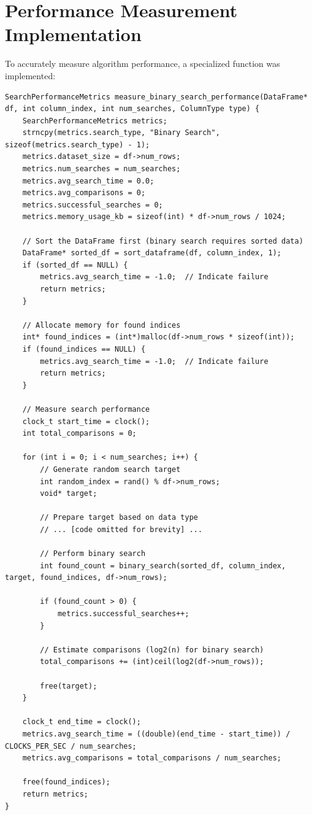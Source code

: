 \section{Performance Measurement Implementation}

To accurately measure algorithm performance, a specialized function was implemented:

\begin{lstlisting}[style=c]
SearchPerformanceMetrics measure_binary_search_performance(DataFrame* df, int column_index, int num_searches, ColumnType type) {
    SearchPerformanceMetrics metrics;
    strncpy(metrics.search_type, "Binary Search", sizeof(metrics.search_type) - 1);
    metrics.dataset_size = df->num_rows;
    metrics.num_searches = num_searches;
    metrics.avg_search_time = 0.0;
    metrics.avg_comparisons = 0;
    metrics.successful_searches = 0;
    metrics.memory_usage_kb = sizeof(int) * df->num_rows / 1024;

    // Sort the DataFrame first (binary search requires sorted data)
    DataFrame* sorted_df = sort_dataframe(df, column_index, 1);
    if (sorted_df == NULL) {
        metrics.avg_search_time = -1.0;  // Indicate failure
        return metrics;
    }

    // Allocate memory for found indices
    int* found_indices = (int*)malloc(df->num_rows * sizeof(int));
    if (found_indices == NULL) {
        metrics.avg_search_time = -1.0;  // Indicate failure
        return metrics;
    }

    // Measure search performance
    clock_t start_time = clock();
    int total_comparisons = 0;

    for (int i = 0; i < num_searches; i++) {
        // Generate random search target
        int random_index = rand() % df->num_rows;
        void* target;
        
        // Prepare target based on data type
        // ... [code omitted for brevity] ...

        // Perform binary search
        int found_count = binary_search(sorted_df, column_index, target, found_indices, df->num_rows);
        
        if (found_count > 0) {
            metrics.successful_searches++;
        }
        
        // Estimate comparisons (log2(n) for binary search)
        total_comparisons += (int)ceil(log2(df->num_rows));
        
        free(target);
    }

    clock_t end_time = clock();
    metrics.avg_search_time = ((double)(end_time - start_time)) / CLOCKS_PER_SEC / num_searches;
    metrics.avg_comparisons = total_comparisons / num_searches;

    free(found_indices);
    return metrics;
}
\end{lstlisting}

